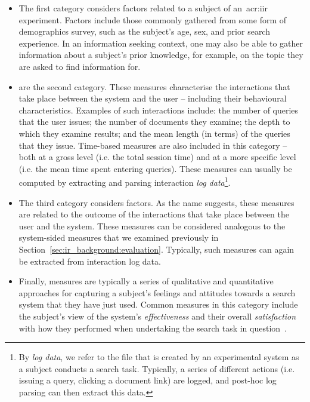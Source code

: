\begin{itemize}
    
    \item{The first category considers  factors related to a subject of an~\gls{acr:iir} experiment. Factors include those commonly gathered from some form of demographics survey, such as the subject's age, sex, and prior search experience. In an information seeking context, one may also be able to gather information about a subject's prior knowledge, for example, on the topic they are asked to find information for.}
    
    \item{ are the second category. These measures characterise the interactions that take place between the system and the user -- including their behavioural characteristics. Examples of such interactions include: the number of queries that the user issues; the number of documents they examine; the depth to which they examine results; and the mean length (in terms) of the queries that they issue. Time-based measures are also included in this category -- both at a gross level (i.e. the total session time) and at a more specific level (i.e. the mean time spent entering queries). These measures can usually be computed by extracting and parsing interaction \emph{log data}\footnote{By \emph{log data}, we refer to the file that is created by an experimental system as a subject conducts a search task. Typically, a series of different actions (i.e. issuing a query, clicking a document link) are logged, and post-hoc log parsing can then extract this data.}.}
    
    \item{The third category considers  factors. As the name suggests, these measures are related to the outcome of the interactions that take place between the user and the system. These measures can be considered analogous to the system-sided measures that we examined previously in Section~\ref{sec:ir_background:evaluation}. Typically, such measures can again be extracted from interaction log data.}
    
    \item{Finally,  measures are typically a series of qualitative and quantitative approaches for capturing a subject's feelings and attitudes towards a search system that they have just used. Common measures in this category include the subject's view of the system's \emph{effectiveness} and their overall \emph{satisfaction} with how they performed when undertaking the search task in question~\citep{hornbaek2006usability}.}
    
\end{itemize}

